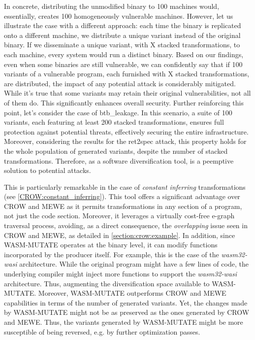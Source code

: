 In concrete, distributing the unmodified binary to 100 machines would, essentially, creates 100 homogeneously vulnerable machines.
However, let us illustrate the case with a different approach: each time the binary is replicated onto a different machine, we distribute a unique variant instead of the original binary. 
If we disseminate a unique variant, with X stacked transformations, to each machine, every system would run a distinct \wasm binary. 
Based on our findings, even when some binaries are still vulnerable, we can confidently say that if 100 variants of a vulnerable program, each furnished with X stacked transformations, are distributed, the impact of any potential attack is considerably mitigated.
While it's true that some variants may retain their original vulnerabilities, not all of them do. 
This significantly enhances overall security. 
Further reinforcing this point, let's consider the case of btb\_leakage. 
In this scenario, a suite of 100 variants, each featuring at least 200 stacked transformations, ensures full protection against potential threats, effectively securing the entire infrastructure.
Moreover, considering the results for the ret2spec attack, this property holds for the whole population of generated variants, despite the number of stacked transformations.
Therefore, \tool as a software diversification tool, is a peemptive solution to potential attacks.

This is particularly remarkable in the case of \emph{constant inferring} transformations (see \autoref{CROW:constant_inferring}).
This tool offers a significant advantage over CROW and MEWE as it permits transformations in any section of a \wasm program, not just the code section.
Moreover, it leverages a virtually cost-free e-graph traversal process, avoiding, as a direct consequence, the \emph{overlapping} issue seen in CROW and MEWE, as detailed in \autoref{section:crow:example}. 
In addition, since WASM-MUTATE operates at the binary level, it can modify functions incorporated by the \Wasm producer itself.
For example, this is the case of the \emph{wasm32-wasi} architecture.
While the original program might have a few lines of code, the underlying compiler might inject more functions to support the \emph{wasm32-wasi} architecture.
Thus, augmenting the diversification space available to WASM-MUTATE.
Moreover, WASM-MUTATE outperforms CROW and MEWE capabilities in terms of the number of generated variants.
Yet, the changes made by WASM-MUTATE might not be as preserved as the ones generated by CROW and MEWE.
Thus, the variants generated by WASM-MUTATE might be more susceptible of being reversed, e.g. by further optimization passes.


